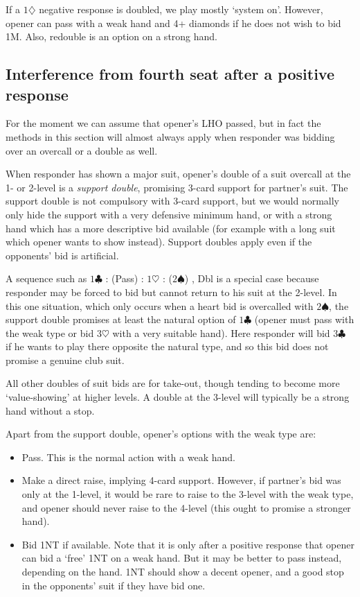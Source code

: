 \documentclass{article}
\newcommand{\sz}{\spadesuit}
\newcommand{\hz}{\heartsuit}
\newcommand{\dz}{\diamondsuit}
\newcommand{\cz}{\clubsuit}
\begin{document}
\vspace{4mm}
If a $1\dz$ negative response is doubled, we play mostly `system on'. However, opener can pass with a weak hand and 4+ diamonds if he does not wish to bid 1M. Also, redouble is an option on a strong hand.

\subsection{Interference from fourth seat after a positive response}

For the moment we can assume that opener's LHO passed, but in fact the methods in this section will almost always apply when responder was bidding over an overcall or a double as well.

When responder has shown a major suit, opener's double of a suit overcall at the 1- or 2-level is a \emph{support double}, promising 3-card support for partner's suit. The support double is not compulsory with 3-card support, but we would normally only hide the support with a very defensive minimum hand, or with a strong hand which has a more descriptive bid available (for example with a long suit which opener wants to show instead). Support doubles apply even if the opponents' bid is artificial.

A sequence such as $1\cz$ : (Pass) : $1\hz$ : ($2\sz$) , Dbl is a special case because responder may be forced to bid but cannot return to his suit at the 2-level. In this one situation, which only occurs when a heart bid is overcalled with $2\sz$, the support double promises at least the natural option of $1\cz$ (opener must pass with the weak type or bid $3\hz$ with a very suitable hand). Here responder will bid $3\cz$ if he wants to play there opposite the natural type, and so this bid does not promise a genuine club suit.

All other doubles of suit bids are for take-out, though tending to become more `value-showing' at higher levels. A double at the 3-level will typically be a strong hand without a stop.

Apart from the support double, opener's options with the weak type are:
\begin{itemize}
\item Pass. This is the normal action with a weak hand.
\item Make a direct raise, implying 4-card support. However, if partner's bid was only at the 1-level, it would be rare to raise to the 3-level with the weak type, and opener should never raise to the 4-level (this ought to promise a stronger hand).
\item Bid 1NT if available. Note that it is only after a positive response that opener can bid a `free' 1NT on a weak hand. But it may be better to pass instead, depending on the hand. 1NT should show a decent opener, and a good stop in the opponents' suit if they have bid one.
\end{itemize}
\end{document}

